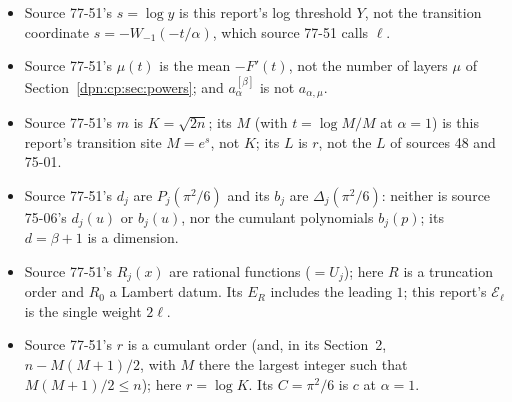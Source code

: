 \documentclass[11pt]{article}
\numberwithin{equation}{section}
\theoremstyle{definition}\newtheorem{definition}[theorem]{Definition}
\theoremstyle{remark}\newtheorem{remark}[theorem]{Remark}
\begin{document}
\begin{itemize}
\item Source 77-51's $s=\log y$ is this report's log threshold $Y$, not the
      transition coordinate $s=-W_{-1}(-t/\alpha)$, which source 77-51 calls
      $\ell$.
\item Source 77-51's $\mu(t)$ is the mean $-F'(t)$, not the number of layers
      $\mu$ of Section~\ref{dpn:cp:sec:powers}; and $a^{[\beta]}_\alpha$ is not
      $a_{\alpha,\mu}$.
\item Source 77-51's $m$ is $K=\sqrt{2n}$; its $M$ (with $t=\log M/M$ at
      $\alpha=1$) is this report's transition site $M=e^s$, not $K$; its $L$
      is $r$, not the $L$ of sources 48 and 75-01.
\item Source 77-51's $d_j$ are $P_j(\pi^2/6)$ and its $b_j$ are
      $\Delta_j(\pi^2/6)$: neither is source 75-06's $d_j(u)$ or $b_j(u)$, nor
      the cumulant polynomials $b_j(p)$; its $d=\beta+1$ is a dimension.
\item Source 77-51's $R_j(x)$ are rational functions ($=U_j$); here $R$ is a
      truncation order and $R_0$ a Lambert datum.  Its $E_R$ includes the
      leading $1$; this report's $\mathcal E_\ell$ is the single weight $2\ell$.
\item Source 77-51's $r$ is a cumulant order (and, in its Section~2,
      $n-M(M+1)/2$, with $M$ there the largest integer such that $M(M+1)/2\le n$); here $r=\log K$.  Its $C=\pi^2/6$ is $c$ at $\alpha=1$.
\end{itemize}
\end{document}
